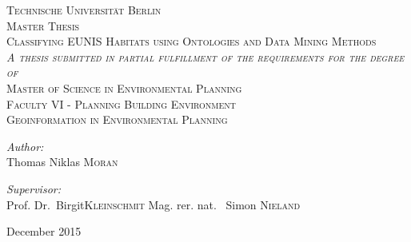 \begin{titlepage}
\begin{center}

\textsc{\LARGE Technische Universit\"at Berlin}\\[0.5cm]
\textsc{Master Thesis}\\[1.5cm]

\textsc{\Large Classifying EUNIS Habitats using Ontologies and Data Mining
Methods}\\[1.5cm]
\textsc{\textit{A thesis submitted in partial fulfillment of the requirements
for the degree of}}\\[1.25cm]
\textsc{\Large Master of Science in Environmental Planning}\\[1.5cm]
\textsc{Faculty VI - Planning Building Environment\\
 Geoinformation in Environmental Planning}\\[2cm]

\noindent
\begin{minipage}{0.5\textwidth}
\begin{flushleft} \large
\emph{Author:}\\
Thomas Niklas \textsc{Moran}\\
\end{flushleft}
\end{minipage}%
\begin{minipage}{0.5\textwidth}
\begin{flushright} \large
\emph{Supervisor:} \\
Prof. Dr.~Birgit\textsc{Kleinschmit}
Mag. rer. nat. ~Simon \textsc{Nieland}
\end{flushright}
\end{minipage}

\vfill

{\large December 2015}

\end{center}
\end{titlepage}